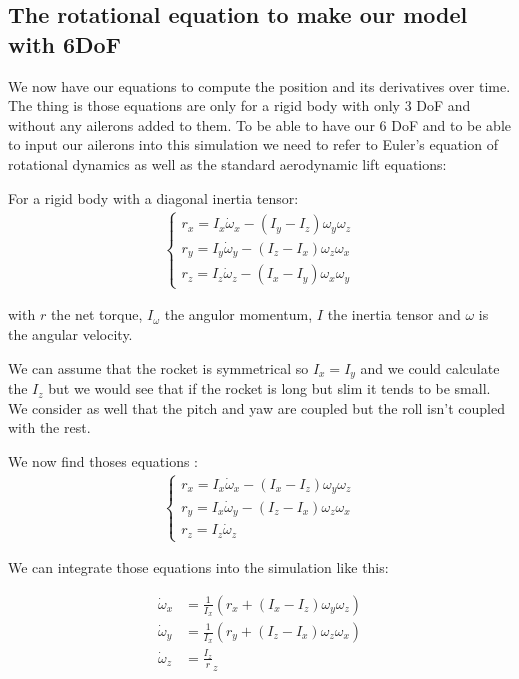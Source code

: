 \subsection{The rotational equation to make our model with 6DoF}

We now have our equations to compute the position and its derivatives over
time. The thing is those equations are only for a rigid body with only 3 DoF
and without any ailerons added to them. To be able to have our 6 DoF and to be
able to input our ailerons into this simulation we need to refer to Euler's
equation of rotational dynamics as well as the standard aerodynamic lift
equations:

For a rigid body with a diagonal inertia tensor:
\begin{gather*}
    \begin{cases}
        r_x = I_x \dot{\omega}_x - (I_y - I_z)\omega_y \omega_z \\
        r_y = I_y \dot{\omega}_y - (I_z - I_x)\omega_z \omega_x \\
        r_z = I_z \dot{\omega}_z - (I_x - I_y)\omega_x \omega_y
    \end{cases}
\end{gather*}

with $r$ the net torque, $I_\omega$ the angulor momentum, $I$ the inertia
tensor and $\omega$ is the angular velocity.

We can assume that the rocket is symmetrical so $I_x=I_y$ and we could
calculate the $I_z$ but we would see that if the rocket is long but slim it
tends to be small. We consider as well that the pitch and yaw are coupled but
the roll isn't coupled with the rest.

We now find thoses equations :
\begin{gather*}
    \begin{cases}
        r_x = I_x \dot{\omega}_x - (I_x - I_z)\omega_y \omega_z \\
        r_y = I_x \dot{\omega}_y - (I_z - I_x)\omega_z \omega_x \\
        r_z = I_z \dot{\omega}_z
    \end{cases}
\end{gather*}

We can integrate those equations into the simulation like this:

\begin{align*}
    \dot{\omega}_x & = \frac{1}{I_x}(r_x + (I_x - I_z)\omega_y \omega_z) \\
    \dot{\omega}_y & = \frac{1}{I_x}(r_y + (I_z - I_x)\omega_z \omega_x) \\
    \dot{\omega}_z & = \frac{I_z}r_z                                     \\
\end{align*}


